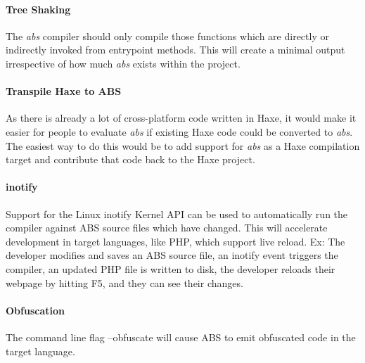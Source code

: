 \documentclass[hidelinks]{article}
\begin{document}
\paragraph{Tree Shaking} The \textit{abs} compiler should only compile those functions which are directly or indirectly invoked from entrypoint methods. This will create a minimal output irrespective of how much \textit{abs} exists within the project.
\paragraph{Transpile Haxe to ABS} As there is already a lot of cross-platform code written in Haxe, it would make it easier for people to evaluate \textit{abs} if existing Haxe code could be converted to \textit{abs}. The easiest way to do this would be to add support for \textit{abs} as a Haxe compilation target and contribute that code back to the Haxe project.
\paragraph{inotify} Support for the Linux inotify Kernel API can be used to automatically run the compiler against ABS source files which have changed. This will accelerate development in target languages, like PHP, which support live reload. Ex: The developer modifies and saves an ABS source file, an inotify event triggers the compiler, an updated PHP file is written to disk, the developer reloads their webpage by hitting F5, and they can see their changes.
\paragraph{Obfuscation} The command line flag --obfuscate will cause ABS to emit obfuscated code in the target language.
\end{document}
